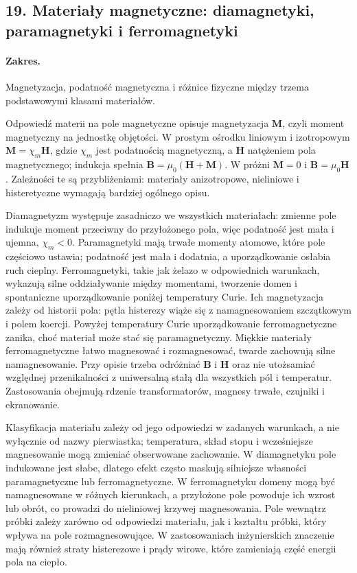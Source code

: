 \documentclass[11pt,a4paper]{article}
\begin{document}
\subsection{19. Materiały magnetyczne: diamagnetyki, paramagnetyki i ferromagnetyki}
\paragraph{Zakres.} Magnetyzacja, podatność magnetyczna i różnice fizyczne między trzema podstawowymi klasami materiałów.

Odpowiedź materii na pole magnetyczne opisuje magnetyzacja $\mathbf M$, czyli moment magnetyczny na jednostkę objętości. W prostym ośrodku liniowym i izotropowym $\mathbf M=\chi_m\mathbf H$, gdzie $\chi_m$ jest podatnością magnetyczną, a $\mathbf H$ natężeniem pola magnetycznego; indukcja spełnia $\mathbf B=\mu_0(\mathbf H+\mathbf M)$. W próżni $\mathbf M=0$ i $\mathbf B=\mu_0\mathbf H$. Zależności te są przybliżeniami: materiały anizotropowe, nieliniowe i histeretyczne wymagają bardziej ogólnego opisu.

Diamagnetyzm występuje zasadniczo we wszystkich materiałach: zmienne pole indukuje moment przeciwny do przyłożonego pola, więc podatność jest mała i ujemna, $\chi_m<0$. Paramagnetyki mają trwałe momenty atomowe, które pole częściowo ustawia; podatność jest mała i dodatnia, a uporządkowanie osłabia ruch cieplny. Ferromagnetyki, takie jak żelazo w odpowiednich warunkach, wykazują silne oddziaływanie między momentami, tworzenie domen i spontaniczne uporządkowanie poniżej temperatury Curie. Ich magnetyzacja zależy od historii pola: pętla histerezy wiąże się z namagnesowaniem szczątkowym i polem koercji. Powyżej temperatury Curie uporządkowanie ferromagnetyczne zanika, choć materiał może stać się paramagnetyczny. Miękkie materiały ferromagnetyczne łatwo magnesować i rozmagnesować, twarde zachowują silne namagnesowanie. Przy opisie trzeba odróżniać $\mathbf B$ i $\mathbf H$ oraz nie utożsamiać względnej przenikalności z uniwersalną stałą dla wszystkich pól i temperatur. Zastosowania obejmują rdzenie transformatorów, magnesy trwałe, czujniki i ekranowanie.

Klasyfikacja materiału zależy od jego odpowiedzi w zadanych warunkach, a nie wyłącznie od nazwy pierwiastka; temperatura, skład stopu i wcześniejsze magnesowanie mogą zmieniać obserwowane zachowanie. W diamagnetyku pole indukowane jest słabe, dlatego efekt często maskują silniejsze własności paramagnetyczne lub ferromagnetyczne. W ferromagnetyku domeny mogą być namagnesowane w różnych kierunkach, a przyłożone pole powoduje ich wzrost lub obrót, co prowadzi do nieliniowej krzywej magnesowania. Pole wewnątrz próbki zależy zarówno od odpowiedzi materiału, jak i kształtu próbki, który wpływa na pole rozmagnesowujące. W zastosowaniach inżynierskich znaczenie mają również straty histerezowe i prądy wirowe, które zamieniają część energii pola na ciepło.
\end{document}
